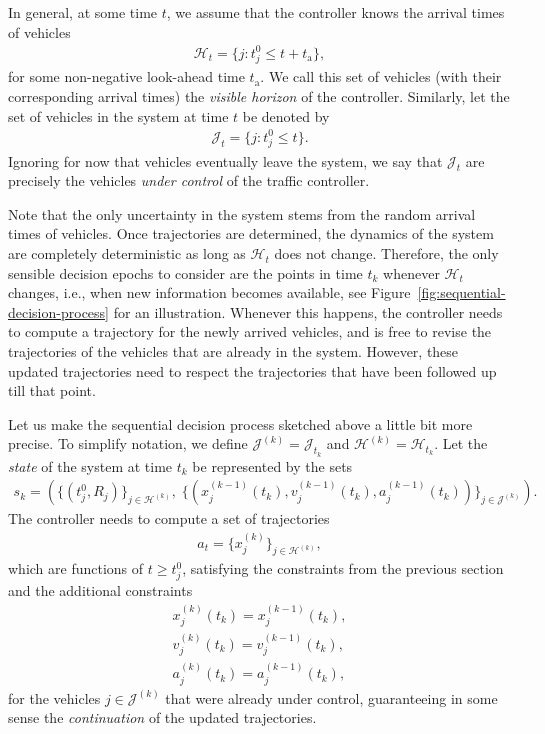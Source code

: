 \documentclass{article}
\theoremstyle{definition}
\theoremstyle{plain}
\begin{document}
In general, at some time $t$, we assume that the controller knows the arrival
times of vehicles
\begin{align}
  \mathcal{H}_{t} = \{ j : t_{j}^{0} \leq t + t_{\text{a}}\} ,
\end{align}
for some non-negative look-ahead time $t_{\text{a}}$. We call this set of
vehicles (with their corresponding arrival times) the \textit{visible horizon}
of the controller. Similarly, let the set of vehicles in the system at time $t$
be denoted by
\begin{align}
  \mathcal{J}_{t} = \{ j : t_{j}^{0} \leq t \} .
\end{align}
Ignoring for now that vehicles eventually leave the system, we say that
$\mathcal{J}_{t}$ are precisely the vehicles \textit{under control} of the
traffic controller.

Note that the only uncertainty in the system stems from the random arrival times
of vehicles. Once trajectories are determined, the dynamics of the system are
completely deterministic as long as $\mathcal{H}_{t}$ does not change.
Therefore, the only sensible decision epochs to consider are the points in time
$t_{k}$ whenever $\mathcal{H}_{t}$ changes, i.e., when new information becomes
available, see Figure~\ref{fig:sequential-decision-process} for an illustration.
Whenever this happens, the controller needs to compute a trajectory for the
newly arrived vehicles, and is free to revise the trajectories of the vehicles
that are already in the system. However, these updated trajectories need to
respect the trajectories that have been followed up till that point.

Let us make the sequential decision process sketched above a little bit more
precise. To simplify notation, we define
$\mathcal{J}^{(k)} = \mathcal{J}_{t_{k}}$ and
$\mathcal{H}^{(k)} = \mathcal{H}_{t_{k}}$. Let the \textit{state} of the system
at time $t_{k}$ be represented by the sets
\begin{align}
  s_{k} = (\{(t_{j}^{0}, R_{j})\}_{j \in \mathcal{H}^{(k)}}, \;
  \{(x_{j}^{(k-1)}(t_{k}), v_{j}^{(k-1)}(t_{k}), a_{j}^{(k-1)}(t_{k}))\}_{j \in \mathcal{J}^{(k)}} ) .
\end{align}
The controller needs to compute a set of trajectories
\begin{align}
a_{t} = \{ x_{j}^{(k)}\}_{j \in \mathcal{H}^{(k)}} ,
\end{align}
which are functions of $t \geq t_{j}^{0}$, satisfying the constraints from the
previous section and the additional constraints
\begin{subequations}
\begin{align}
  x_{j}^{(k)}(t_{k}) = x_{j}^{(k-1)}(t_{k}), \\
  v_{j}^{(k)}(t_{k}) = v_{j}^{(k-1)}(t_{k}), \\
  a_{j}^{(k)}(t_{k}) = a_{j}^{(k-1)}(t_{k}),
\end{align}
\end{subequations}
for the vehicles $j \in \mathcal{J}^{(k)}$ that were already under control,
guaranteeing in some sense the \textit{continuation} of the updated
trajectories.
\end{document}
